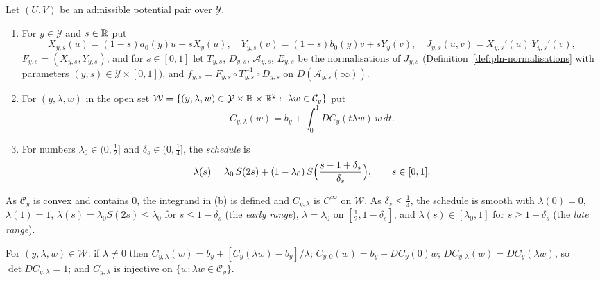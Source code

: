 \begin{definition}\label{def:pln-charts}
Let $(U,V)$ be an admissible potential pair over $\mathcal Y$.
\begin{enumerate}[label=(\alph*)]
\item For $y\in\mathcal Y$ and $s\in\mathbb{R}$ put
 \[
  X_{y,s}(u)=(1-s)a_0(y)u+sX_y(u),\quad Y_{y,s}(v)=(1-s)b_0(y)v+sY_y(v),\quad
  J_{y,s}(u,v)=X_{y,s}'(u)\,Y_{y,s}'(v),
 \]
 $F_{y,s}=(X_{y,s},Y_{y,s})$, and for $s\in[0,1]$ let $T_{y,s}$, $D_{y,s}$, $\mathcal A_{y,s}$, $E_{y,s}$ be the
 normalisations of $J_{y,s}$ (Definition~\ref{def:pln-normalisations} with parameters $(y,s)\in\mathcal Y\times[0,1]$),
 and $f_{y,s}=F_{y,s}\circ T_{y,s}^{-1}\circ D_{y,s}$ on $D(\mathcal A_{y,s}(\infty))$.
\item For $(y,\lambda,w)$ in the open set $\mathcal W=\{(y,\lambda,w)\in\mathcal Y\times\mathbb{R}\times\mathbb{R}^2:\ \lambda w\in\mathcal C_y\}$ put
 \[
  C_{y,\lambda}(w)=b_y+\int_0^1DC_y(t\lambda w)\,w\,dt .
 \]
\item For numbers $\lambda_0\in(0,\frac12]$ and $\delta_s\in(0,\frac14]$, the \emph{schedule} is
 \[
  \lambda(s)=\lambda_0\,S(2s)+(1-\lambda_0)\,S\Bigl(\frac{s-1+\delta_s}{\delta_s}\Bigr),\qquad s\in[0,1].
 \]
\end{enumerate}
\end{definition}

As $\mathcal C_y$ is convex and contains $0$, the integrand in (b) is defined and $C_{y,\lambda}$ is $C^\infty$ on $\mathcal W$. As $\delta_s\le\frac14$, the schedule is smooth with $\lambda(0)=0$, $\lambda(1)=1$, $\lambda(s)=\lambda_0S(2s)\le\lambda_0$ for $s\le1-\delta_s$ (the \emph{early range}), $\lambda=\lambda_0$ on $[\frac12,1-\delta_s]$, and $\lambda(s)\in[\lambda_0,1]$ for $s\ge1-\delta_s$ (the \emph{late range}).

\begin{lemma}\label{lem:pln-chart-lambda}
For $(y,\lambda,w)\in\mathcal W$: if $\lambda\ne0$ then $C_{y,\lambda}(w)=b_y+[C_y(\lambda w)-b_y]/\lambda$; $C_{y,0}(w)=b_y+DC_y(0)w$;
$DC_{y,\lambda}(w)=DC_y(\lambda w)$, so $\det DC_{y,\lambda}=1$; and $C_{y,\lambda}$ is injective on
$\{w:\lambda w\in\mathcal C_y\}$.
\end{lemma}

